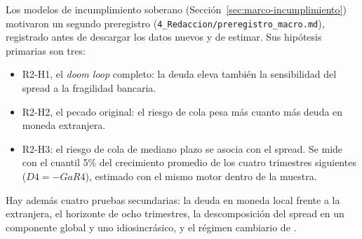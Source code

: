 Los modelos de incumplimiento soberano (Sección~\ref{sec:marco-incumplimiento}) motivaron un segundo preregistro (\texttt{4\_Redaccion/preregistro\_macro.md}), registrado antes de descargar los datos nuevos y de estimar. Sus hipótesis primarias son tres:
\begin{itemize}
    \item R2-H1, el \textit{doom loop} completo: la deuda eleva también la sensibilidad del spread a la fragilidad bancaria.
    \item R2-H2, el pecado original: el riesgo de cola pesa más cuanto más deuda en moneda extranjera.
    \item R2-H3: el riesgo de cola de mediano plazo se asocia con el spread. Se mide con el cuantil 5\% del crecimiento promedio de los cuatro trimestres siguientes ($D4=-GaR4$), estimado con el mismo motor dentro de la muestra.
\end{itemize}
Hay además cuatro pruebas secundarias: la deuda en moneda local frente a la extranjera, el horizonte de ocho trimestres, la descomposición del spread en un componente global y uno idiosincrásico, y el régimen cambiario de \citet{IlzetzkiReinhartRogoff2019}.

